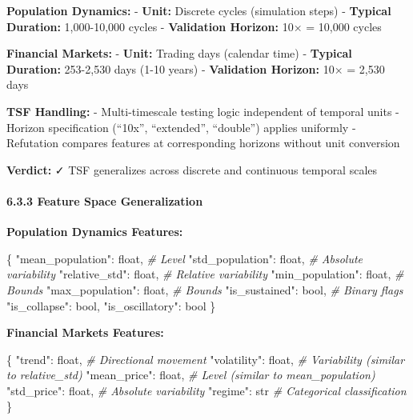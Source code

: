 \documentclass[
]{article}
\newenvironment{Shaded}{}{}
\newcommand{\BuiltInTok}[1]{\textcolor[rgb]{0.00,0.50,0.00}{#1}}
\newcommand{\CommentTok}[1]{\textcolor[rgb]{0.38,0.63,0.69}{\textit{#1}}}
\newcommand{\NormalTok}[1]{#1}
\newcommand{\StringTok}[1]{\textcolor[rgb]{0.25,0.44,0.63}{#1}}
\begin{document}
\textbf{Population Dynamics:} - \textbf{Unit:} Discrete cycles
(simulation steps) - \textbf{Typical Duration:} 1,000-10,000 cycles -
\textbf{Validation Horizon:} 10× = 10,000 cycles

\textbf{Financial Markets:} - \textbf{Unit:} Trading days (calendar
time) - \textbf{Typical Duration:} 253-2,530 days (1-10 years) -
\textbf{Validation Horizon:} 10× = 2,530 days

\textbf{TSF Handling:} - Multi-timescale testing logic independent of
temporal units - Horizon specification (``10x'', ``extended'',
``double'') applies uniformly - Refutation compares features at
corresponding horizons without unit conversion

\textbf{Verdict:} ✓ TSF generalizes across discrete and continuous
temporal scales

\paragraph{6.3.3 Feature Space
Generalization}\label{feature-space-generalization}

\textbf{Population Dynamics Features:}

\begin{Shaded}
\begin{Highlighting}[]
\NormalTok{\{}
    \StringTok{"mean\_population"}\NormalTok{: }\BuiltInTok{float}\NormalTok{,      }\CommentTok{\# Level}
    \StringTok{"std\_population"}\NormalTok{: }\BuiltInTok{float}\NormalTok{,        }\CommentTok{\# Absolute variability}
    \StringTok{"relative\_std"}\NormalTok{: }\BuiltInTok{float}\NormalTok{,          }\CommentTok{\# Relative variability}
    \StringTok{"min\_population"}\NormalTok{: }\BuiltInTok{float}\NormalTok{,        }\CommentTok{\# Bounds}
    \StringTok{"max\_population"}\NormalTok{: }\BuiltInTok{float}\NormalTok{,        }\CommentTok{\# Bounds}
    \StringTok{"is\_sustained"}\NormalTok{: }\BuiltInTok{bool}\NormalTok{,           }\CommentTok{\# Binary flags}
    \StringTok{"is\_collapse"}\NormalTok{: }\BuiltInTok{bool}\NormalTok{,}
    \StringTok{"is\_oscillatory"}\NormalTok{: }\BuiltInTok{bool}
\NormalTok{\}}
\end{Highlighting}
\end{Shaded}

\textbf{Financial Markets Features:}

\begin{Shaded}
\begin{Highlighting}[]
\NormalTok{\{}
    \StringTok{"trend"}\NormalTok{: }\BuiltInTok{float}\NormalTok{,                 }\CommentTok{\# Directional movement}
    \StringTok{"volatility"}\NormalTok{: }\BuiltInTok{float}\NormalTok{,            }\CommentTok{\# Variability (similar to relative\_std)}
    \StringTok{"mean\_price"}\NormalTok{: }\BuiltInTok{float}\NormalTok{,            }\CommentTok{\# Level (similar to mean\_population)}
    \StringTok{"std\_price"}\NormalTok{: }\BuiltInTok{float}\NormalTok{,             }\CommentTok{\# Absolute variability}
    \StringTok{"regime"}\NormalTok{: }\BuiltInTok{str}                   \CommentTok{\# Categorical classification}
\NormalTok{\}}
\end{Highlighting}
\end{Shaded}
\end{document}
